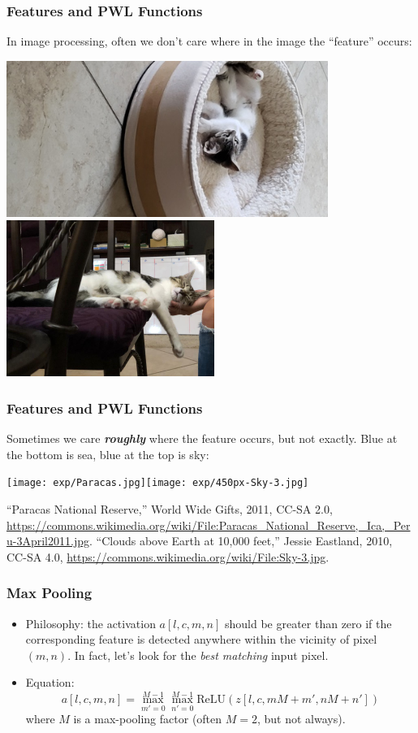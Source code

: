 \documentclass{beamer}
\begin{document}
\begin{frame}
  \frametitle{Features and PWL Functions}

  In image processing, often we don't care where in the image the
  ``feature'' occurs:
  \centerline{\includegraphics[height=2in]{figs/kitten.jpg}\hspace*{1cm}
    \includegraphics[height=2in]{figs/IMG-20200826-WA0000.jpg}}
\end{frame}

\begin{frame}
  \frametitle{Features and PWL Functions}

  Sometimes we care {\bf\em roughly} where the feature occurs, but not
  exactly.  Blue at the bottom is sea, blue at the top is sky:
  \centerline{\texttt{[image: exp/Paracas.jpg]}\hspace*{2mm}\texttt{[image: exp/450px-Sky-3.jpg]}}
  \begin{tiny}
    ``Paracas National Reserve,'' World Wide Gifts, 2011, CC-SA 2.0,
    \url{https://commons.wikimedia.org/wiki/File:Paracas_National_Reserve,_Ica,_Peru-3April2011.jpg}.
    ``Clouds above Earth at 10,000 feet,'' Jessie Eastland, 2010, CC-SA 4.0,
    \url{https://commons.wikimedia.org/wiki/File:Sky-3.jpg}.
  \end{tiny}
\end{frame}

\begin{frame}
  \frametitle{Max Pooling}
  \begin{itemize}
  \item Philosophy: the activation $a[l,c,m,n]$ should be greater
    than zero if the corresponding feature is detected anywhere within
    the vicinity of pixel $(m,n)$.  In fact, let's look for the {\em
      best matching} input pixel.
  \item Equation:
    \begin{displaymath}
      a[l,c,m,n] = \max_{m'=0}^{M-1}\max_{n'=0}^{M-1} \mbox{ReLU}\left(z[l,c,mM+m',nM+n']\right)
    \end{displaymath}
    where $M$ is a max-pooling factor (often $M=2$, but not always).
  \end{itemize}
\end{frame}
\end{document}
